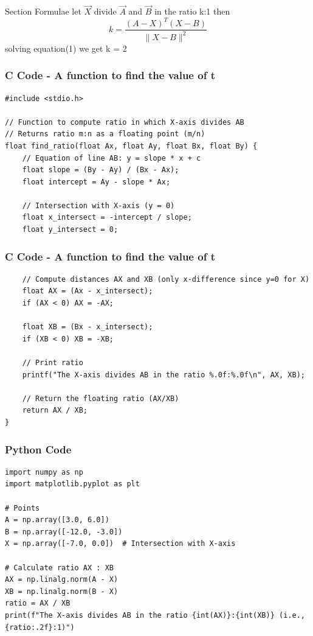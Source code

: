 \documentclass{beamer}
\begin{document}
\begin{frame}{Section Formulae}
let $\vec{X}$ divide $\vec{A}$ and $\vec{B}$ in the ratio k:1 then \\
\begin{equation}
k = \frac{(A - X)^T (X - B)}{\|X - B\|^2}
\end{equation}
solving equation(1) we get k = 2
\end{frame}


\begin{frame}[fragile]
    \frametitle{C Code - A function to find the value of t}

    \begin{lstlisting}
#include <stdio.h>

// Function to compute ratio in which X-axis divides AB
// Returns ratio m:n as a floating point (m/n)
float find_ratio(float Ax, float Ay, float Bx, float By) {
    // Equation of line AB: y = slope * x + c
    float slope = (By - Ay) / (Bx - Ax);
    float intercept = Ay - slope * Ax;

    // Intersection with X-axis (y = 0)
    float x_intersect = -intercept / slope;
    float y_intersect = 0;
     \end{lstlisting}
\end{frame}


    
\begin{frame}[fragile]
    \frametitle{C Code - A function to find the value of t}

    \begin{lstlisting}
    // Compute distances AX and XB (only x-difference since y=0 for X)
    float AX = (Ax - x_intersect);
    if (AX < 0) AX = -AX;

    float XB = (Bx - x_intersect);
    if (XB < 0) XB = -XB;

    // Print ratio
    printf("The X-axis divides AB in the ratio %.0f:%.0f\n", AX, XB);

    // Return the floating ratio (AX/XB)
    return AX / XB;
}

    \end{lstlisting}
\end{frame}

\begin{frame}[fragile]
    \frametitle{Python Code}
    \begin{lstlisting}
import numpy as np
import matplotlib.pyplot as plt

# Points
A = np.array([3.0, 6.0])
B = np.array([-12.0, -3.0])
X = np.array([-7.0, 0.0])  # Intersection with X-axis

# Calculate ratio AX : XB
AX = np.linalg.norm(A - X)
XB = np.linalg.norm(B - X)
ratio = AX / XB
print(f"The X-axis divides AB in the ratio {int(AX)}:{int(XB)} (i.e., {ratio:.2f}:1)")


    \end{lstlisting}
\end{frame}
\end{document}
